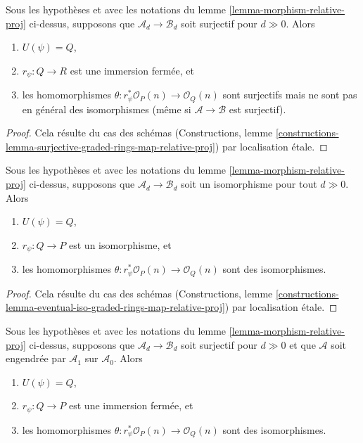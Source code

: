 \begin{lemma}
\label{lemma-surjective-graded-rings-map-relative-proj}
Sous les hypothèses et avec les notations du lemme \ref{lemma-morphism-relative-proj}
ci-dessus, supposons que $\mathcal{A}_d \to \mathcal{B}_d$ soit surjectif pour
$d \gg 0$. Alors
\begin{enumerate}
\item $U(\psi) = Q$,
\item $r_\psi : Q \to R$ est une immersion fermée, et
\item les homomorphismes $\theta : r_\psi^*\mathcal{O}_P(n) \to \mathcal{O}_Q(n)$
sont surjectifs mais ne sont pas en général des isomorphismes (même si
$\mathcal{A} \to \mathcal{B}$ est surjectif).
\end{enumerate}
\end{lemma}

\begin{proof}
Cela résulte du cas des schémas
(Constructions, lemme
\ref{constructions-lemma-surjective-graded-rings-map-relative-proj})
par localisation \'etale.
\end{proof}

\begin{lemma}
\label{lemma-eventual-iso-graded-rings-map-relative-proj}
Sous les hypothèses et avec les notations du lemme \ref{lemma-morphism-relative-proj}
ci-dessus, supposons que $\mathcal{A}_d \to \mathcal{B}_d$ soit un isomorphisme pour tout
$d \gg 0$. Alors
\begin{enumerate}
\item $U(\psi) = Q$,
\item $r_\psi : Q \to P$ est un isomorphisme, et
\item les homomorphismes $\theta : r_\psi^*\mathcal{O}_P(n) \to \mathcal{O}_Q(n)$
sont des isomorphismes.
\end{enumerate}
\end{lemma}

\begin{proof}
Cela résulte du cas des schémas
(Constructions, lemme
\ref{constructions-lemma-eventual-iso-graded-rings-map-relative-proj})
par localisation \'etale.
\end{proof}

\begin{lemma}
\label{lemma-surjective-generated-degree-1-map-relative-proj}
Sous les hypothèses et avec les notations du lemme \ref{lemma-morphism-relative-proj}
ci-dessus, supposons que $\mathcal{A}_d \to \mathcal{B}_d$ soit surjectif pour $d \gg 0$
et que $\mathcal{A}$ soit engendrée par $\mathcal{A}_1$ sur $\mathcal{A}_0$.
Alors
\begin{enumerate}
\item $U(\psi) = Q$,
\item $r_\psi : Q \to P$ est une immersion fermée, et
\item les homomorphismes $\theta : r_\psi^*\mathcal{O}_P(n) \to \mathcal{O}_Q(n)$
sont des isomorphismes.
\end{enumerate}
\end{lemma}


